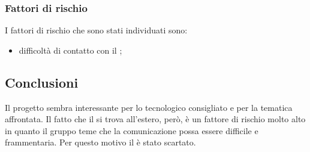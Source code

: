 \documentclass[../StudioDiFattibilita.tex]{subfiles}
\begin{document}
			\subsubsection{Fattori di rischio}
			I fattori di rischio che sono stati individuati sono:
			\begin{itemize}
				\item difficoltà di contatto con il ;
			\end{itemize}
			\subsection{Conclusioni}
			Il progetto sembra interessante per lo  tecnologico consigliato e per la tematica affrontata. Il fatto che il  si trova all'estero, però, è un fattore di rischio molto alto in quanto il gruppo teme che la comunicazione possa essere difficile e frammentaria. Per questo motivo il  è stato scartato.
\end{document}

